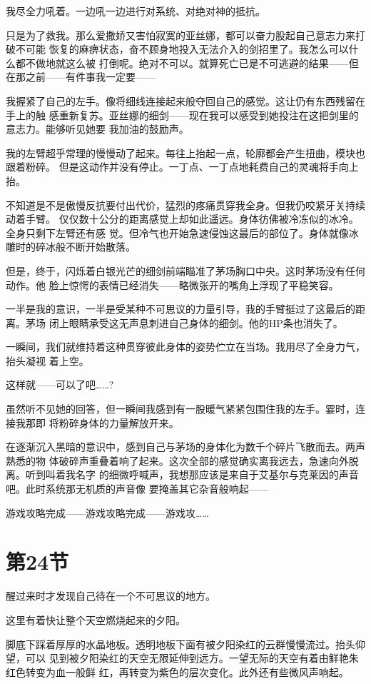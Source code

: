 \documentclass[11pt]{book}
\begin{document}
我尽全力吼着。一边吼一边进行对系统、对绝对神的抵抗。

只是为了救我。那么爱撒娇又害怕寂寞的亚丝娜，都可以奋力股起自己意志力来打破不可能
恢复的麻痹状态，奋不顾身地投入无法介入的剑招里了。我怎么可以什么都不做地就这么被
打倒呢。绝对不可以。就算死亡已是不可逃避的结果——但在那之前——有件事我一定要——

我握紧了自己的左手。像将细线连接起来般夺回自己的感觉。这让仍有东西残留在手上的触
感重新复苏。亚丝娜的细剑——现在我可以感受到她投注在这把剑里的意志力。能够听见她要
我加油的鼓励声。

我的左臂超乎常理的慢慢动了起来。每往上抬起一点，轮廓都会产生扭曲，模块也跟着粉碎。
但是这动作并没有停止。一丁点、一丁点地耗费自己的灵魂将手向上抬。

不知道是不是傲慢反抗要付出代价，猛烈的疼痛贯穿我全身。但我仍咬紧牙关持续动着手臂。
仅仅数十公分的距离感觉上却如此遥远。身体彷佛被冷冻似的冰冷。全身只剩下左臂还有感
觉。但冷气也开始急速侵蚀这最后的部位了。身体就像冰雕时的碎冰般不断开始散落。

但是，终于，闪烁着白银光芒的细剑前端瞄准了茅场胸口中央。这时茅场没有任何动作。他
脸上惊愕的表情已经消失——略微张开的嘴角上浮现了平稳笑容。

一半是我的意识，一半是受某种不可思议的力量引导，我的手臂挺过了这最后的距离。茅场
闭上眼睛承受这无声息刺进自己身体的细剑。他的HP条也消失了。

一瞬间，我们就维持着这种贯穿彼此身体的姿势伫立在当场。我用尽了全身力气，抬头凝视
着上空。

这样就——可以了吧……?

虽然听不见她的回答，但一瞬间我感到有一股暖气紧紧包围住我的左手。霎时，连接我那即
将粉碎身体的力量解放开来。

在逐渐沉入黑暗的意识中，感到自己与茅场的身体化为数千个碎片飞散而去。两声熟悉的物
体破碎声重叠着响了起来。这次全部的感觉确实离我远去，急速向外脱离。听到叫着我名字
的细微呼喊声，我想那应该是来自于艾基尔与克莱因的声音吧。此时系统那无机质的声音像
要掩盖其它杂音般响起——

游戏攻略完成——游戏攻略完成——游戏攻……
\section{第24节}
\label{sec:orgb7e7f61}
醒过来时才发现自己待在一个不可思议的地方。

这里有着快让整个天空燃烧起来的夕阳。

脚底下踩着厚厚的水晶地板。透明地板下面有被夕阳染红的云群慢慢流过。抬头仰望，可以
见到被夕阳染红的天空无限延伸到远方。一望无际的天空有着由鲜艳朱红色转变为血一般鲜
红，再转变为紫色的层次变化。此外还有些微风声响起。
\end{document}
